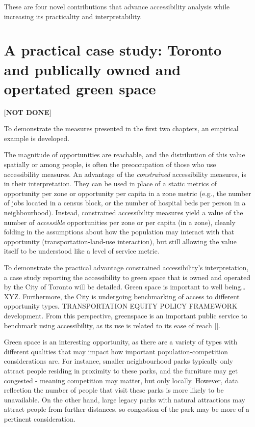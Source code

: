 \documentclass[
11pt, %
oneside, %
english, %
singlespacing, %
]{macthesis} %
\begin{document}
These are four novel contributions that advance accessibility analysis while increasing its practicality and interpretability.

\section{A practical case study: Toronto and publically owned and opertated green space}\label{a-practical-case-study-toronto-and-publically-owned-and-opertated-green-space}

{[}\textbf{NOT DONE}{]}

To demonstrate the measures presented in the first two chapters, an empirical example is developed.

The magnitude of opportunities are reachable, and the distribution of this value spatially or among people, is often the preoccupation of those who use accessibility measures. An advantage of the \emph{constrained} accessibility measures, is in their interpretation. They can be used in place of a static metrics of opportunity per zone or opportunity per capita in a zone metric (e.g., the number of jobs located in a census block, or the number of hospital beds per person in a neighbourhood). Instead, constrained accessibility measures yield a value of the number of \emph{accessible} opportunities per zone or per capita (in a zone), cleanly folding in the assumptions about how the population may interact with that opportunity (transportation-land-use interaction), but still allowing the value itself to be understood like a level of service metric.

To demonstrate the practical advantage constrained accessibility's interpretation, a case study reporting the accessibility to green space that is owned and operated by the City of Toronto will be detailed. Green space is important to well being\ldots{} XYZ. Furthermore, the City is undergoing benchmarking of access to different opportunity types. TRANSPORTATION EQUITY POLICY FRAMEWORK development. From this perspective, greenspace is an important public service to benchmark using accessibility, as its use is related to its ease of reach {[}{]}.

Green space is an interesting opportunity, as there are a variety of types with different qualities that may impact how important population-competition considerations are. For instance, smaller neighbourhood parks typically only attract people residing in proximity to these parks, and the furniture may get congested - meaning competition may matter, but only locally. However, data reflection the number of people that visit these parks is more likely to be unavailable. On the other hand, large legacy parks with natural attractions may attract people from further distances, so congestion of the park may be more of a pertinent consideration.
\end{document}
